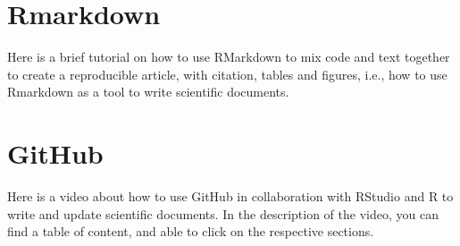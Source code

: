 \documentclass[
]{book}
\newlength{\cslhangindent}
\newlength{\cslentryspacingunit} %
\newenvironment{CSLReferences}[2] %
 {%
  \setlength{\parindent}{0pt}
  \ifodd #1
  \let\oldpar\par
  \def\par{\hangindent=\cslhangindent\oldpar}
  \fi
  \setlength{\parskip}{#2\cslentryspacingunit}
 }%
 {}
\begin{document}
\hypertarget{rmarkdown}{%
\section{Rmarkdown}\label{rmarkdown}}

Here is a brief tutorial on how to use RMarkdown to mix code and text together to create a reproducible article, with citation, tables and figures, i.e., how to use Rmarkdown as a tool to write scientific documents.

\hypertarget{github}{%
\section{GitHub}\label{github}}

Here is a video about how to use GitHub in collaboration with RStudio and R to write and update scientific documents. In the description of the video, you can find a table of content, and able to click on the respective sections.

\hypertarget{refs}{}
\begin{CSLReferences}{0}{0}
\end{CSLReferences}

  
\end{document}

